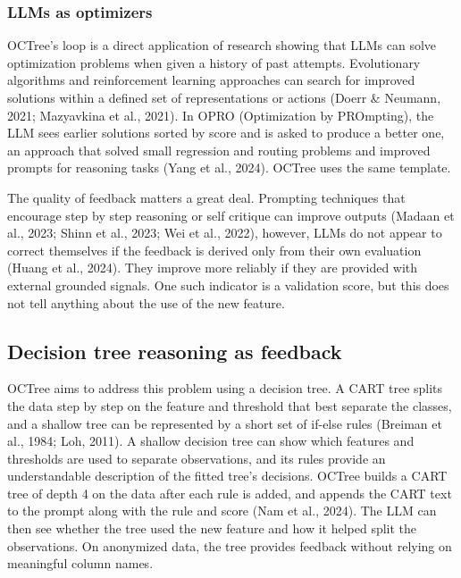 \documentclass[11pt]{article}
\begin{document}
\subsubsection{LLMs as optimizers}

OCTree's loop is a direct application of research showing that LLMs can solve optimization problems
when given a history of past attempts. Evolutionary algorithms and reinforcement learning approaches
can search for improved solutions within a defined set of representations or actions (Doerr \&
Neumann, 2021; Mazyavkina et al., 2021). In OPRO (Optimization by PROmpting), the LLM sees earlier
solutions sorted by score and is asked to produce a better one, an approach that solved small
regression and routing problems and improved prompts for reasoning tasks (Yang et al., 2024). OCTree
uses the same template.

The quality of feedback matters a great deal. Prompting techniques that encourage step by step
reasoning or self critique can improve outputs (Madaan et al., 2023; Shinn et al., 2023; Wei et al.,
2022), however, LLMs do not appear to correct themselves if the feedback is derived only from their
own evaluation (Huang et al., 2024). They improve more reliably if they are provided with external
grounded signals. One such indicator is a validation score, but this does not tell anything about
the use of the new feature.

\subsection{Decision tree reasoning as feedback}

OCTree aims to address this problem using a decision tree. A CART tree splits the data step by step
on the feature and threshold that best separate the classes, and a shallow tree can be represented
by a short set of if-else rules (Breiman et al., 1984; Loh, 2011). A shallow decision tree can show
which features and thresholds are used to separate observations, and its rules provide an
understandable description of the fitted tree's decisions. OCTree builds a CART tree of depth 4 on
the data after each rule is added, and appends the CART text to the prompt along with the rule and
score (Nam et al., 2024). The LLM can then see whether the tree used the new feature and how it
helped split the observations. On anonymized data, the tree provides feedback without relying on
meaningful column names.
\end{document}
